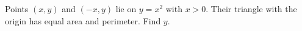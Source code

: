 Points $(x,y)$ and $(-x,y)$ lie on $y=x^2$ with $x>0$. Their triangle with the origin has equal area and perimeter. Find $y$.
